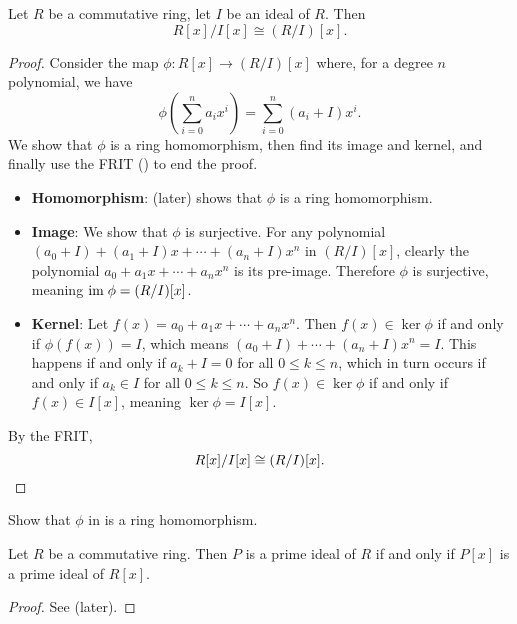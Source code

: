 \begin{proposition}\label{prop-polynomial-ring-quotient-ideal-polynomial-ring-cong-quotient-polynomial-ring}
    Let $R$ be a commutative ring, let $I$ be an ideal of $R$. Then
    \[
        R[x]/I[x] \cong (R/I)[x].
    \]
\end{proposition}
\begin{proof}
    Consider the map $\phi: R[x] \to (R/I)[x]$ where, for a degree $n$ polynomial, we have
    \[
        \phi\left(\sum_{i=0}^na_ix^i\right) = \sum_{i=0}^n (a_i+I)x^i.
    \]
    We show that $\phi$ is a ring homomorphism, then find its image and kernel, and finally use the FRIT () to end the proof.
    \begin{itemize}
        \item \textbf{Homomorphism}:  (later) shows that $\phi$ is a ring homomorphism.

        \item \textbf{Image}: We show that $\phi$ is surjective. For any polynomial $(a_0+I) + (a_1+I)x + \cdots + (a_n+I)x^n$ in $(R/I)[x]$, clearly the polynomial $a_0 + a_1x + \cdots + a_nx^n$ is its pre-image. Therefore $\phi$ is surjective, meaning $\mathrm{im}\; \phi = (R/I)[x]$.

        \item \textbf{Kernel}: Let $f(x) = a_0 + a_1x + \cdots + a_nx^n$. Then $f(x) \in \ker\phi$ if and only if $\phi(f(x)) = I$, which means $(a_0+I) + \cdots + (a_n+I)x^n = I$. This happens if and only if $a_k + I = 0$ for all $0 \leq k \leq n$, which in turn occurs if and only if $a_k \in I$ for all $0 \leq k \leq n$. So $f(x) \in \ker\phi$ if and only if $f(x) \in I[x]$, meaning $\ker\phi = I[x]$.
    \end{itemize}
    By the FRIT,
    \[
        R[x]/I[x] \cong (R/I)[x].\qedhere
    \]
\end{proof}

\begin{exercise}\label{exercise-polynomial-ring-maps-to-quotient-polynomial-ring-is-homomorphism}
    Show that $\phi$ in  is a ring homomorphism.
\end{exercise}

\begin{theorem}\label{thrm-prime-ideal-iff-prime-ideal-in-polynomial-ring}
    Let $R$ be a commutative ring. Then $P$ is a prime ideal of $R$ if and only if $P[x]$ is a prime ideal of $R[x]$.
\end{theorem}
\begin{proof}
    See  (later).
\end{proof}

